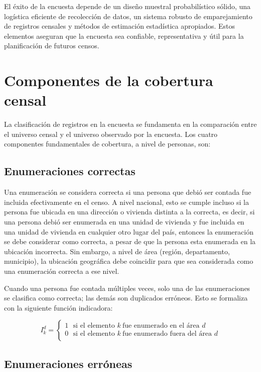 \documentclass[
  12pt,
]{book}
\begin{document}
El éxito de la encuesta depende de un diseño muestral probabilístico sólido, una logística eficiente de recolección de datos, un sistema robusto de emparejamiento de registros censales y métodos de estimación estadística apropiados. Estos elementos aseguran que la encuesta sea confiable, representativa y útil para la planificación de futuros censos.

\section{Componentes de la cobertura censal}\label{componentes-de-la-cobertura-censal}

La clasificación de registros en la encuesta se fundamenta en la comparación entre el universo censal y el universo observado por la encuesta. Los cuatro componentes fundamentales de cobertura, a nivel de personas, son:

\subsection{Enumeraciones correctas}\label{enumeraciones-correctas}

Una enumeración se considera correcta si una persona que debió ser contada fue incluida efectivamente en el censo. A nivel nacional, esto se cumple incluso si la persona fue ubicada en una dirección o vivienda distinta a la correcta, es decir, si una persona debió ser enumerada en una unidad de vivienda y fue incluida en una unidad de vivienda en cualquier otro lugar del país, entonces la enumeración se debe considerar como correcta, a pesar de que la persona esta enumerada en la ubicación incorrecta. Sin embargo, a nivel de área (región, departamento, municipio), la ubicación geográfica debe coincidir para que sea considerada como una enumeración correcta a ese nivel.

Cuando una persona fue contada múltiples veces, solo una de las enumeraciones se clasifica como correcta; las demás son duplicados erróneos. Esto se formaliza con la siguiente función indicadora:

\[I_k^{d} = \begin{cases} 
1 \ \ \ \text{si el elemento } k \ \text{fue enumerado en el área } d \\
0 \ \ \ \text{si el elemento } k \ \text{fue enumerado fuera del área } d \\
\end{cases} \]

\subsection{Enumeraciones erróneas}\label{enumeraciones-erruxf3neas}
\end{document}
